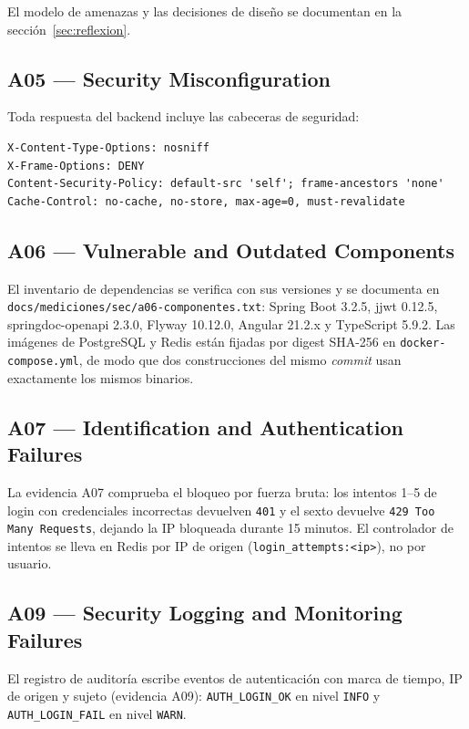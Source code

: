 \documentclass[11pt,a4paper]{article}
\newcommand{\ruta}[1]{\texttt{\footnotesize #1}}
\begin{document}
El modelo de amenazas y las decisiones de diseño se documentan en la
sección~\ref{sec:reflexion}.

\subsection{A05 --- Security Misconfiguration}

Toda respuesta del backend incluye las cabeceras de seguridad:

\begin{lstlisting}[caption={Cabeceras de seguridad (evidencia A05)}]
X-Content-Type-Options: nosniff
X-Frame-Options: DENY
Content-Security-Policy: default-src 'self'; frame-ancestors 'none'
Cache-Control: no-cache, no-store, max-age=0, must-revalidate
\end{lstlisting}

\subsection{A06 --- Vulnerable and Outdated Components}

El inventario de dependencias se verifica con sus versiones y se documenta en
\ruta{docs/mediciones/sec/a06-componentes.txt}: Spring Boot 3.2.5, jjwt
0.12.5, springdoc-openapi 2.3.0, Flyway 10.12.0, Angular 21.2.x y
TypeScript 5.9.2. Las imágenes de PostgreSQL y Redis están fijadas por digest
SHA-256 en \ruta{docker-compose.yml}, de modo que dos construcciones del mismo
\emph{commit} usan exactamente los mismos binarios.

\subsection{A07 --- Identification and Authentication Failures}

La evidencia A07 comprueba el bloqueo por fuerza bruta: los intentos 1--5 de
login con credenciales incorrectas devuelven \texttt{401} y el sexto devuelve
\texttt{429 Too Many Requests}, dejando la IP bloqueada durante 15 minutos.
El controlador de intentos se lleva en Redis por IP de origen
(\texttt{login\_attempts:<ip>}), no por usuario.

\subsection{A09 --- Security Logging and Monitoring Failures}

El registro de auditoría escribe eventos de autenticación con marca de tiempo,
IP de origen y sujeto (evidencia A09): \texttt{AUTH\_LOGIN\_OK} en nivel
\texttt{INFO} y \texttt{AUTH\_LOGIN\_FAIL} en nivel \texttt{WARN}.
\end{document}
